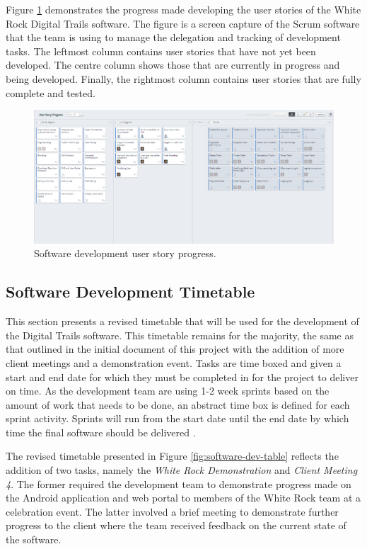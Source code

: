 \documentclass[11pt,a4paper]{article}
\begin{document}
Figure \ref{fig:UserStoryProgress} demonstrates the progress made developing the user stories of the White Rock Digital Trails software. The figure is a screen capture of the Scrum software that the team is using to manage the delegation and tracking of development tasks. The leftmost column contains user stories that have not yet been developed. The centre column shows those that are currently in progress and being developed. Finally, the rightmost column contains user stories that are fully complete and tested.

\begin{figure}[H]
\centering
\includegraphics[width=0.9\linewidth]{./img/UserStoryProgress}
\caption{Software development user story progress.}
\label{fig:UserStoryProgress}
\end{figure}


\subsection{Software Development Timetable}
\label{sec:plan-software-dev}

This section presents a revised timetable that will be used for the development of the Digital Trails software. This timetable remains for the majority, the same as that outlined in the initial document of this project with the addition of more client meetings and a demonstration event. Tasks are time boxed and given a start and end date for which they must be completed in for the project to deliver on time. As the development team are using 1-2 week sprints based on the amount of work that needs to be done, an abstract time box is defined for each sprint activity. Sprints will run from the start date until the end date by which time the final software should be delivered \cite{initialDoc}.

The revised timetable presented in Figure \ref{fig:software-dev-table} reflects the addition of two tasks, namely the \emph{White Rock Demonstration} and \emph{Client Meeting 4}. The former required the development team to demonstrate progress made on the Android application and web portal to members of the White Rock team at a celebration event. The latter involved a brief meeting to demonstrate further progress to the client where the team received feedback on the current state of the software.
\end{document}
